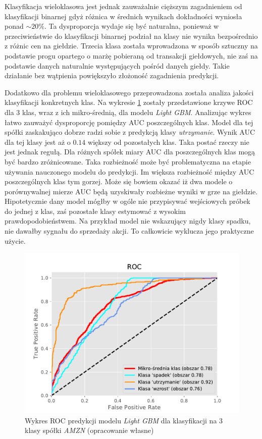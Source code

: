 \documentclass[a4paper, twoside, 11pt, openright]{article}
\begin{document}
Klasyfikacja wieloklasowa jest jednak zauważalnie cięższym zagadnieniem od klasyfikacji binarnej gdyż różnica w średnich wynikach dokładności wyniosła ponad $\sim 20\%$. Ta dysproporcja wydaje się być naturalna, ponieważ w przeciwieństwie do klasyfikacji binarnej podział na klasy nie wynika bezpośrednio z różnic cen na giełdzie. Trzecia klasa została wprowadzona w sposób sztuczny na podstawie progu opartego o marżę pobieraną od transakcji giełdowych, nie zaś na podstawie danych naturalnie występujących pośród danych giełdy. Takie działanie bez wątpienia powiększyło złożoność zagadnienia predykcji.

\bigskip

Dodatkowo dla problemu wieloklasowego przeprowadzona została analiza jakości klasyfikacji konkretnych klas. Na wykresie \ref{img:lgbm_roc_amzn} zostały przedstawione krzywe ROC dla 3 klas, wraz z ich mikro-średnią, dla modelu \textit{Light GBM}. Analizując wykres łatwo zauważyć dysproporcję pomiędzy AUC poszczególnych klas. Model dla tej spółki zaskakująco dobrze radzi sobie z predykcją klasy \textit{utrzymanie}. Wynik AUC dla tej klasy jest aż o $0.14$ większy od pozostałych klas. Taka postać rzeczy nie jest jednak regułą. Dla różnych spółek miary AUC dla poszczególnych klas mogą być bardzo zróżnicowane. Taka rozbieżność może być problematyczna na etapie używania nauczonego modelu do predykcji. Im większa rozbieżność między AUC poszczególnych klas tym gorzej. Może się bowiem okazać iż dwa modele o porównywalnej mierze AUC będą uzyskiwały rozbieżne wyniki w grze na giełdzie. Hipotetycznie dany model mógłby w ogóle nie przypisywać wejściowych próbek do jednej z klas, zaś pozostałe klasy estymować z wysokim prawdopodobieństwem. Na przykład model nie wskazujący nigdy klasy spadku, nie dawałby sygnału do sprzedaży akcji. To całkowicie wyklucza jego praktyczne użycie.

\begin{figure}[H]
\centering \includegraphics[scale=0.8]{img/AMZN_roc_lgbm.pdf}
\caption{Wykres ROC predykcji modelu \textit{Light GBM} dla klasyfikacji na 3 klasy spółki \textit{AMZN} (opracowanie własne)}
\label{img:lgbm_roc_amzn}
\end{figure}
\end{document}
